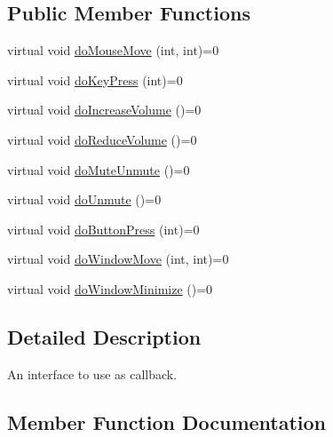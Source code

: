 \subsection*{Public Member Functions}
\begin{DoxyCompactItemize}
\item 
virtual void \hyperlink{classGestro_1_1DisplayControlCallbackInterface_a35d453c78b578d061c89c95b3ae9ee8a}{do\+Mouse\+Move} (int, int)=0
\item 
virtual void \hyperlink{classGestro_1_1DisplayControlCallbackInterface_aa6d1e75bb4b3aa0b0e10497576b1053f}{do\+Key\+Press} (int)=0
\item 
virtual void \hyperlink{classGestro_1_1DisplayControlCallbackInterface_af26f63171de9622c5723363732f590c8}{do\+Increase\+Volume} ()=0
\item 
virtual void \hyperlink{classGestro_1_1DisplayControlCallbackInterface_a8648fb64585379393917e6b50e348070}{do\+Reduce\+Volume} ()=0
\item 
virtual void \hyperlink{classGestro_1_1DisplayControlCallbackInterface_ab660632d549760b0404388fc8e86714a}{do\+Mute\+Unmute} ()=0
\item 
virtual void \hyperlink{classGestro_1_1DisplayControlCallbackInterface_a74ddca7b1ef399a41f6025163407bb4d}{do\+Unmute} ()=0
\item 
virtual void \hyperlink{classGestro_1_1DisplayControlCallbackInterface_ab661600cad2743fd41253fb9cabbee51}{do\+Button\+Press} (int)=0
\item 
virtual void \hyperlink{classGestro_1_1DisplayControlCallbackInterface_a5232eef7102a1db6d227189132c92ebd}{do\+Window\+Move} (int, int)=0
\item 
virtual void \hyperlink{classGestro_1_1DisplayControlCallbackInterface_a677aa306f08c548396a048c680bf5e10}{do\+Window\+Minimize} ()=0
\end{DoxyCompactItemize}


\subsection{Detailed Description}
An interface to use as callback. 

\subsection{Member Function Documentation}
\mbox{\label{classGestro_1_1DisplayControlCallbackInterface_ab661600cad2743fd41253fb9cabbee51}} 
